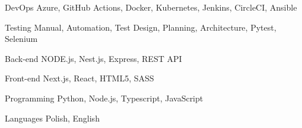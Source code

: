 

\begin{cvskills}

  \cvskill
    {DevOps} %
    {Azure, GitHub Actions, Docker, Kubernetes, Jenkins, CircleCI, Ansible} %

  \cvskill
    {Testing} %
    {Manual, Automation, Test Design, Planning, Architecture, Pytest, Selenium} %

  \cvskill
    {Back-end} %
    {NODE.js, Nest.js, Express, REST API} %

  \cvskill
    {Front-end} %
    {Next.js, React, HTML5, SASS} %

  \cvskill
    {Programming} %
    {Python, Node.js, Typescript, JavaScript} %

  \cvskill
    {Languages} %
    {Polish, English} %

\end{cvskills}
